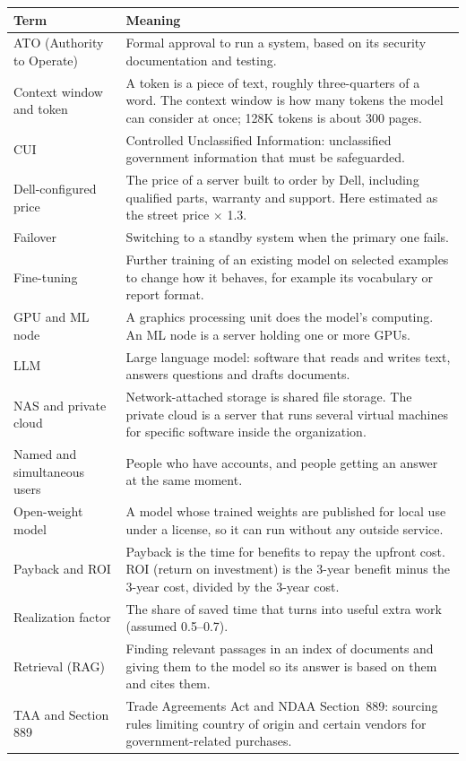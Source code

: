 
{\footnotesize
\begin{xltabular}{\textwidth}{@{}Y{0.55} Y{1.45}@{}}
  \toprule
  Term & Meaning \\
  \midrule
  \endhead
  ATO (Authority to Operate) & Formal approval to run a system, based on its security documentation and testing. \\
  Context window and token & A token is a piece of text, roughly three-quarters of a word. The context window is how many tokens the model can consider at once; 128K tokens is about 300 pages. \\
  CUI & Controlled Unclassified Information: unclassified government information that must be safeguarded. \\
  Dell-configured price & The price of a server built to order by Dell, including qualified parts, warranty and support. Here estimated as the street price $\times$ 1.3. \\
  Failover & Switching to a standby system when the primary one fails. \\
  Fine-tuning & Further training of an existing model on selected examples to change how it behaves, for example its vocabulary or report format. \\
  GPU and ML node & A graphics processing unit does the model's computing. An ML node is a server holding one or more GPUs. \\
  LLM & Large language model: software that reads and writes text, answers questions and drafts documents. \\
  NAS and private cloud & Network-attached storage is shared file storage. The private cloud is a server that runs several virtual machines for specific software inside the organization. \\
  Named and simultaneous users & People who have accounts, and people getting an answer at the same moment. \\
  Open-weight model & A model whose trained weights are published for local use under a license, so it can run without any outside service. \\
  Payback and ROI & Payback is the time for benefits to repay the upfront cost. ROI (return on investment) is the 3-year benefit minus the 3-year cost, divided by the 3-year cost. \\
  Realization factor & The share of saved time that turns into useful extra work (assumed 0.5--0.7). \\
  Retrieval (RAG) & Finding relevant passages in an index of documents and giving them to the model so its answer is based on them and cites them. \\
  TAA and Section 889 & Trade Agreements Act and NDAA Section~889: sourcing rules limiting country of origin and certain vendors for government-related purchases. \\
  \bottomrule
\end{xltabular}}
